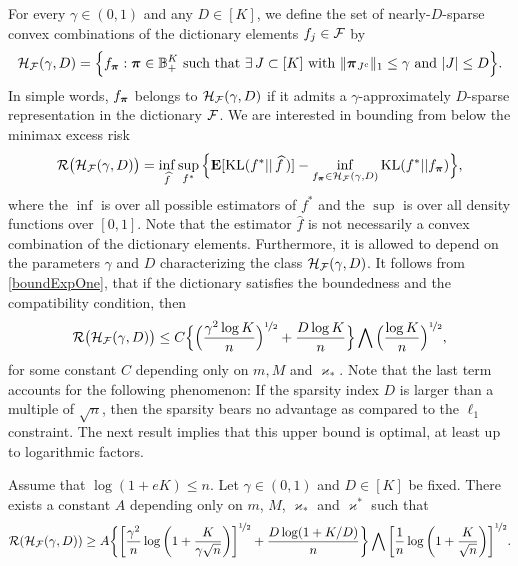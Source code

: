 For every $\gamma \in (0,1)$  and any $D\in [K]$, we define the set of nearly-$D$-sparse
convex combinations of the dictionary elements $f_j\in\mathcal F$ by
\begin{equation}
\mathcal H_\mathcal F(\gamma,D) = \Big\{f_{\boldsymbol \pi} : \boldsymbol \pi\in{\mathbb B}^K_+ \text{ such that }\exists \, J\subset [K]
\text{ with } \|\boldsymbol \pi_{J^c}\|_1\le \gamma \text{ and } |J|\le D\Big\}.
\end{equation}
In simple words, $f_{\boldsymbol \pi}$ belongs to $\mathcal H_\mathcal F(\gamma,D)$ if it admits a $\gamma$-approximately
$D$-sparse representation in the dictionary $\mathcal F$. We are interested in bounding  from
below the minimax excess risk
\begin{equation}
\mathcal R\big(\mathcal H_\mathcal F(\gamma,D)\big) = \inf_{\widehat f} \sup_{f^*}
\Big\{\mathbf E[{\rm KL}(f^*||\,\widehat f\,)] - \inf_{f_{\boldsymbol \pi}\in \mathcal H_\mathcal F(\gamma,D)} {\rm KL}(f^*|| f_{\boldsymbol \pi})\Big\},
\end{equation}
where the $\inf$ is over all possible estimators of $f^*$ and the $\sup$ is over all density functions
over $[0,1]$. Note that the estimator $\hat f$ is not necessarily a convex combination of the
dictionary elements. Furthermore, it is allowed to depend on the parameters $\gamma$ and $D$
characterizing the class $\mathcal H_\mathcal F(\gamma,D)$. It follows from \eqref{boundExpOne}, that if
the dictionary satisfies the boundedness and the compatibility condition, then
\begin{equation}\label{upper}
\mathcal R\big(\mathcal H_\mathcal F(\gamma,D)\big) \le C \Big\{\Big(\frac{\gamma^2\log K}{n}\Big)^{\nicefrac12} + \frac{D\log K}{n}\Big\}\bigwedge \Big(\frac{\log K}{n}\Big)^{\nicefrac12},
\end{equation}
for some constant $C$ depending only on $m,M$ and $\varkappa_*$. Note that the last term  
accounts for the following phenomenon: If the sparsity index $D$ is larger than a multiple 
of $\sqrt{n}$, then the sparsity bears no advantage as compared to the $\ell_1$ constraint. 
The next result implies that this upper bound is optimal, at least up to logarithmic 
factors.

\begin{theorem}
	\label{theorem:lower_bound}
	Assume that $\log(1+eK)\le n$. Let $\gamma\in(0,1)$ and $D\in[K]$ be fixed. There exists 
	a constant $A$ depending only on $m$, $M$, $\varkappa_*$ and  $\varkappa^*$ such that 
	\begin{equation}
	\mathcal R(\mathcal H_\mathcal F(\gamma,D)) \ge A \bigg\{\bigg[\frac{\gamma^2}{n}
	\log\bigg(1+\frac{K}{\gamma\sqrt{n}}\bigg)\bigg]^{\nicefrac12}
	+ \frac{D\log(1+K/D)}{n}\bigg\}\bigwedge \bigg[\frac{1}{n}
	\log\bigg(1+\frac{K}{\sqrt{n}}\bigg)\bigg]^{\nicefrac12}.
	\end{equation}
\end{theorem}

